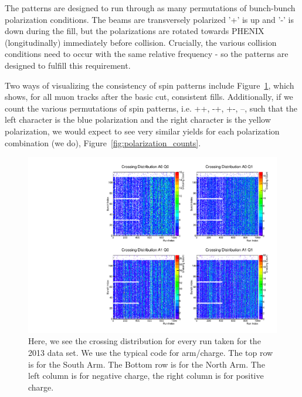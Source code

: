 The patterns are designed to run through as many permutations of bunch-bunch
polarization conditions. The beams are transversely polarized '+' is up and '-'
is down during the fill, but the polarizations are rotated towards PHENIX
(longitudinally) immediately before collision. Crucially, the various collision
conditions need to occur with the same relative frequency - so the patterns are
designed to fulfill this requirement.

Two ways of visualizing the consistency of spin patterns include
Figure~\ref{fig:crossing_count}, which shows, for all muon tracks after the
basic cut, consistent fills. Additionally, if we count the various permutations
of spin patterns, i.e. ++, -+, +-, --, such that the left character is the blue
polarization and the right character is the yellow polarization, we would expect
to see very similar yields for each polarization combination (we do),
Figure~\ref{fig:polarization_counts}.

\begin{figure}
  \centering
  \includegraphics[width=\linewidth]{./figures/crossing_distribution.pdf}
  \caption{
    Here, we see the crossing distribution for every run taken for the 2013 data
    set. We use the typical code for arm/charge. The top row is for the South
    Arm. The Bottom row is for the North Arm. The left column is for negative
    charge, the right column is for positive charge.
  }
  \label{fig:crossing_count}
\end{figure}

